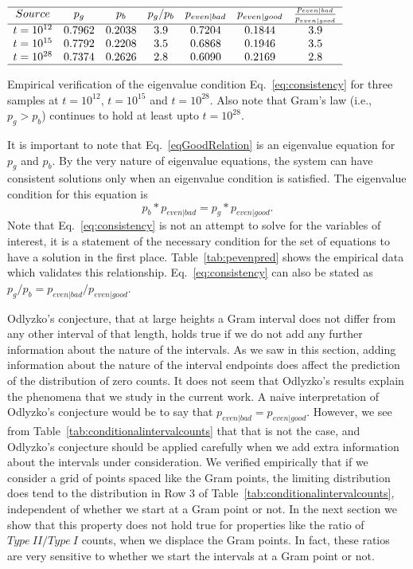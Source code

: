 \documentclass[twoside]{article}
\theoremstyle{definition}
\begin{document}
\begin{table}
\centering \(\begin{array}{ccccccc}
\hline
Source &p_g&p_b& p_g/p_b&p_{even|bad} &p_{even|good}&\frac{p_{even|bad}}{p_{even|good}}\\
\hline
t = 10^{12}&0.7962&0.2038&3.9&0.7204&0.1844&3.9\\
t = 10^{15}&0.7792&0.2208&3.5&0.6868&0.1946&3.5\\
t = 10^{28}&0.7374&0.2626&2.8&0.6090&0.2169&2.8\\
\hline
\end{array}\)
\caption{Empirical verification of  the eigenvalue condition Eq.~\ref{eq:consistency} for three samples at $t=10^{12}$, $t=10^{15}$  and $t=10^{28}$. Also note that Gram's law (i.e., $p_g > p_b$)  continues to hold
at least upto  $t = 10^{28}$.} 
\label{tab:pevenpred}
\end{table}
 It is important to note that Eq.~\ref{eqGoodRelation} is an eigenvalue equation for  $p_g$ and $p_b$. By the very nature of eigenvalue equations, the system can have consistent solutions only when an eigenvalue condition is satisfied. The eigenvalue condition for this equation is
\begin{equation}
p_b*p_{even|bad} = p_g*p_{even|good}.
\label{eq:consistency}
\end{equation}
 Note that Eq.~\ref{eq:consistency} is not an attempt to solve for the variables of interest, it is a statement of the  necessary condition
 for the set of equations to have a solution in the first place. Table~\ref{tab:pevenpred} shows the empirical data which validates this relationship. Eq.~\ref{eq:consistency} can also be stated as $p_g/p_b = p_{even|bad} /p_{even|good}$.


Odlyzko's conjecture,  that at large heights a Gram interval does not differ from any other interval of that length, holds true if we do not add any 
further information about the nature of the intervals. As we saw in this section, adding information about the nature of the interval endpoints does affect the prediction of the
distribution of zero counts. It does not seem that Odlyzko's results explain the phenomena that we study in the current work. A naive interpretation
of Odlyzko's conjecture would be to say that $p_{even|bad}  = p_{even|good}$. However,  we see from Table~\ref{tab:conditionalintervalcounts}  that
that is not the case, and Odlyzko's conjecture should be applied carefully when we add extra information about the intervals under consideration.
We verified empirically that if we consider a  grid of points spaced like the Gram points, the limiting distribution does tend to the distribution
in Row 3 of Table~\ref{tab:conditionalintervalcounts}, independent of whether we start at a Gram point or not. In the next section we show that this
property does not hold true for properties like  the ratio of $Type~II/Type~I$ counts, when we displace the Gram points. In fact, these ratios
are very sensitive to whether we start the intervals at a Gram point or not.
\end{document}
